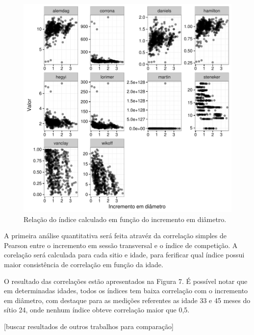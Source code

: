 \documentclass[article]{jss}
\begin{document}
\begin{CodeChunk}
\begin{figure}

{\centering \includegraphics{comp3-paper_files/figure-latex/disp_indices-1} 

}

\caption[Relação do índice calculado em função do incremento em diâmetro]{Relação do índice calculado em função do incremento em diâmetro.}\label{fig:disp_indices}
\end{figure}
\end{CodeChunk}

A primeira análise quantitativa será feita atravéz da correlação simples
de Pearson entre o incremento em sessão transversal e o índice de
competição. A corelação será calculada para cada sitio e idade, para
ferificar qual índice possui maior consistência de correlação em função
da idade.

O resultado das correlações estão apresentados na Figura 7. É possível
notar que em determinadas idades, todos os índices tem baixa correlação
com o incremento em diâmetro, com destaque para as medições referentes
as idade 33 e 45 meses do sítio 24, onde nenhum índice obteve correlação
maior que 0,5.

{[}buscar resultados de outros trabalhos para comparação{]}
\end{document}
